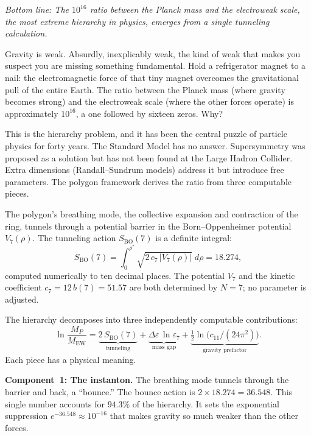 \medskip

\noindent\textit{Bottom line: The $10^{16}$ ratio between the Planck
mass and the electroweak scale, the most extreme hierarchy in
physics, emerges from a single tunneling calculation.}

\medskip

Gravity is weak. Absurdly, inexplicably weak, the kind of weak that
makes you suspect you are missing something fundamental. Hold a
refrigerator magnet to a nail: the electromagnetic force of that tiny
magnet overcomes the gravitational pull of the entire Earth. The ratio between the
Planck mass (where gravity becomes strong) and the electroweak scale
(where the other forces operate) is approximately $10^{16}$, a one
followed by sixteen zeros. Why?

This is the hierarchy problem, and it has been the central puzzle of
particle physics for forty years. The Standard Model has no answer.
Supersymmetry was proposed as a solution but has not been found at
the Large Hadron Collider. Extra dimensions (Randall--Sundrum models)
address it but introduce free parameters. The polygon framework
derives the ratio from three computable pieces.

The polygon's breathing mode, the collective expansion and
contraction of the ring, tunnels through a potential barrier in the
Born--Oppenheimer potential $V_7(\rho)$. The tunneling action
$S_{\mathrm{BO}}(7)$ is a definite integral:
\[
  S_{\mathrm{BO}}(7) = \int_0^{\rho^*}\!\sqrt{2\,c_7\,|V_7(\rho)|}
  \;d\rho = 18.274,
\]
computed numerically to ten decimal places. The potential $V_7$ and
the kinetic coefficient $c_7 = 12\,b(7) = 51.57$ are both determined
by $N = 7$; no parameter is adjusted.

The hierarchy decomposes into three independently computable
contributions:
\begin{equation}\label{eq:hierarchy-companion}
  \ln\!\frac{M_P}{M_{\mathrm{EW}}}
  = \underbrace{2\,S_{\mathrm{BO}}(7)}_{\text{tunneling}}
  + \underbrace{\Delta\varepsilon\,\ln\varepsilon_7}_{\text{mass gap}}
  + \underbrace{\tfrac{1}{2}\ln\!\bigl(c_{11}/(24\pi^2)\bigr)}_{\text{gravity prefactor}}.
\end{equation}
Each piece has a physical meaning.

\textbf{Component~1: The instanton.} The breathing mode tunnels
through the barrier and back, a ``bounce.'' The bounce action is
$2 \times 18.274 = 36.548$. This single number accounts for $94.3\%$
of the hierarchy. It sets the exponential suppression
$e^{-36.548} \approx 10^{-16}$ that makes gravity so much weaker than
the other forces.

